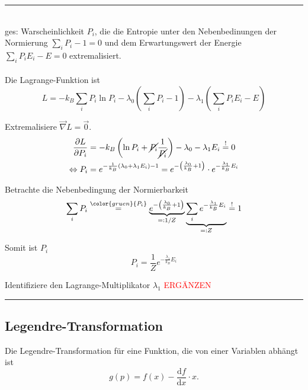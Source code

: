 \documentclass{article}
\newcommand{\diff}{\mathrm{d}}
\newcommand{\lr}[1]{\left(#1\right)}
\newcommand{\comment}[1]{{\color{gruen} {#1}}}
\begin{document}
{\color{blue}
\hrule
	\\
	ges: Warscheinlichkeit $P_i$, die die Entropie unter den Nebenbedinungen der Normierung $\sum_i P_i - 1 = 0$ und dem Erwartungswert der Energie $\sum_i P_i E_i - E = 0$ extremalisiert.\\
	\\
	Die Lagrange-Funktion ist
		$$L = -k_B \sum_i P_i \ln P_i - \lambda_0 \lr{ \sum_i P_i - 1 } - \lambda_1 \lr{ \sum_i P_i E_i - E }$$
	
	Extremalisiere $\vec{\nabla} L = \vec{0}$.
		\begin{align*}
			\frac{\partial L}{\partial P_i} &= -k_B \lr{ \ln P_i + \cancel{P_i} \frac{1}{\cancel{P_i}} } - \lambda_0 - \lambda_1 E_i \stackrel{!}{=} 0 \\
			\Leftrightarrow P_i &= e^{ -\frac{1}{k_B} \lr{ \lambda_0 + \lambda_1 E_i } - 1 } = e^{-\lr{ \frac{\lambda_0}{k_B} + 1 }} \cdot e^{-\frac{\lambda_1}{k_B} E_i}
		\end{align*}
	
	Betrachte die Nebenbedingung der Normierbarkeit
		$$\sum_i P_i \stackrel{\comment{P_i}}{=} \underbrace{e^{-\lr{ \frac{\lambda_0}{k_B} + 1 }}}_{=:1/Z} \underbrace{\sum_i e^{-\frac{\lambda_1}{k_B} E_i}}_{=:Z}  \stackrel{!}{=} 1$$
	
	Somit ist $P_i$
		$$P_i = \frac{1}{Z} e^{ -\frac{\lambda_1}{k_B}E_i }$$
	
	Identifiziere den Lagrange-Multiplikator $\lambda_1$ \textcolor{red}{ERGÄNZEN}
%		

\hrule
}


\newpage


\subsection{Legendre-Transformation}
Die Legendre-Transformation für eine Funktion, die von einer Variablen abhängt ist
	\begin{equation}
		g(p) = f(x) - \frac{\diff f}{\diff x}\cdot x.
	\end{equation}
\end{document}
